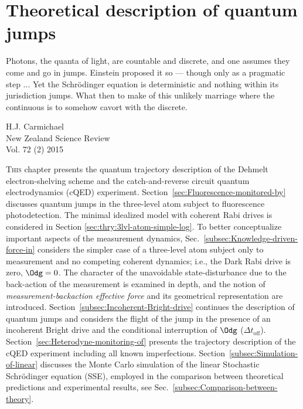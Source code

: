 
\chapter{Theoretical description of quantum jumps\label{chap:theoretical-description-jumps} }


\singlespacing 
\setlength{\epigraphwidth}{.6\textwidth}
\epigraph{
Photons, the quanta of light, are countable and discrete, and one assumes they come and go in jumps. Einstein proposed it so --- though only as a pragmatic step  ... Yet the Schrödinger equation is deterministic and nothing within its jurisdiction jumps. What then to make of this unlikely marriage where the continuous is to somehow cavort with the discrete.}
{H.J. Carmichael\\New Zealand Science Review\\ Vol. 72 (2) 2015} 
\setlength{\epigraphwidth}{.4\textwidth} %
\doublespacing\noindent\lettrine{T}{his} chapter presents the quantum trajectory
description of the Dehmelt electron-shelving scheme and the catch-and-reverse
circuit quantum electrodynamics (cQED) experiment. Section~\ref{sec:Fluorescence-monitored-by}
discusses quantum jumps in the three-level atom subject to fluorescence
photodetection. The minimal idealized model with coherent Rabi drives
is considered in Section \ref{sec:thry:3lvl-atom-simple-log}. To
better conceptualize important aspects of the measurement dynamics,
Sec.~\ref{subsec:Knowledge-driven-force-in} considers the simpler
case of a three-level atom subject only to measurement and no competing
coherent dynamics; i.e., the Dark Rabi drive is zero, $\Odg=0$. The
character of the unavoidable state-disturbance due to the back-action
of the measurement is examined in depth, and the notion of \emph{measurement-backaction
effective force} and its geometrical representation are introduced.
Section~\ref{subsec:Incoherent-Bright-drive} continues the description
of quantum jumps and considers the flight of the jump in the presence
of an incoherent Bright drive and the conditional interruption of
$\Odg$ ($\Delta t_{\mathrm{off}}$). Section~\ref{sec:Heterodyne-monitoring-of}
presents the trajectory description of the cQED experiment including
all known imperfections. Section~\ref{subsec:Simulation-of-linear}
discusses the Monte Carlo simulation of the linear Stochastic Schrödinger
equation (SSE), employed in the comparison between theoretical predictions
and experimental results, see Sec.~\ref{subsec:Comparison-between-theory}. 

